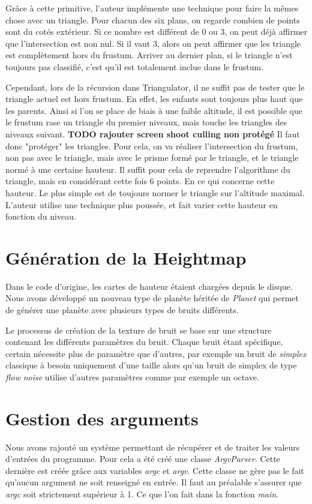   Grâce à cette primitive, l'auteur implémente une technique pour faire la mêmes chose avec un triangle. Pour chacun des six plans, on regarde combien de points sont du cotés extérieur. Si ce nombre est différent de 0 ou 3, on peut déjà affirmer que l'intersection est non nul. Si il vaut 3, alors on peut affirmer que les triangle est complètement hors du frustum. Arriver au dernier plan, si le triangle n'est toujours pas classifié, c'est qu'il est totalement inclue dans le frustum.
  
  Cependant, lors de la récursion dans Triangulator, il ne suffit pas de tester que le triangle actuel est hors frustum. En effet, les enfants sont toujours plus haut que les parents. Ainsi si l'on se place de biais à une faible altitude, il est possible que le frustum rase un triangle du premier niveaux, mais touche les triangles des niveaux suivant. 
  \textbf{TODO rajouter screen shoot culling non protégé}
  Il faut donc "protéger" les triangles. Pour cela, on va réaliser l'intersection du frustum, non pas avec le triangle, mais avec le prisme formé par le triangle, et le triangle normé à une certaine hauteur. Il suffit pour cela de reprendre l'algorithme du triangle, mais en considérant cette fois 6 points.
  En ce qui concerne cette hauteur. Le plus simple est de toujours normer le triangle sur l'altitude maximal. L'auteur utilise une technique plus poussée, et fait varier cette hauteur en fonction du niveau.  
  
  \section{Génération de la Heightmap}
  
  Dans le code d'origine, les cartes de hauteur étaient chargées depuis le disque. Nous avons développé un nouveau type de planète héritée de \textit{Planet} qui permet de générer une planète avec plusieurs types de bruits différents.
  
  Le processus de création de la texture de bruit se base sur une structure contenant les différents paramètres du bruit.
  Chaque bruit étant spécifique, certain nécessite plus de paramètre que d'autres, par exemple un bruit de \textit{simplex} classique à besoin uniquement d'une taille alors qu'un bruit
  de simplex de type \textit{flow noise} utilise d'autres paramètres comme par exemple un octave. 
  
  \section{Gestion des arguments}
  Nous avons rajouté un système permettant de récupérer et de traiter les valeurs d'entrées du programme.
  Pour cela a été créé une classe \textit{ArgvParser}. Cette dernière est créée grâce aux variables \textit{argc} et \textit{argv}. 
  Cette classe ne gère pas le fait qu'aucun argument ne soit renseigné en entrée. Il faut au préalable s'assurer que \textit{argc} soit strictement supérieur à 1. Ce que l'on fait dans la fonction \textit{main}.\\
  
